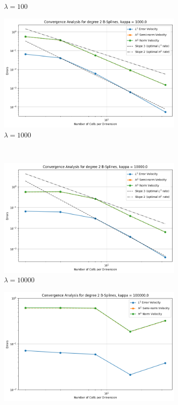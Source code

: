 \documentclass[a4paper,12pt,twoside]{report}
\begin{document}
\begin{figure}[!h]
\begin{subfigure}[b]{0.49\textwidth}
		\caption{$\lambda=100$}
	\end{subfigure}
	\begin{subfigure}[b]{0.49\textwidth}
		\centering
		\includegraphics[width=\textwidth]{convergence_degree_2_non_mixed_kappa=1000.0}
		\caption{$\lambda=1000$}
	\end{subfigure}
	\\
	\begin{subfigure}[b]{0.49\textwidth}
		\centering
		\includegraphics[width=\textwidth]{convergence_degree_2_non_mixed_kappa=10000.0}
		\caption{$\lambda=10000$}
	\end{subfigure}
	\begin{subfigure}[b]{0.49\textwidth}
		\centering
		\includegraphics[width=\textwidth]{convergence_degree_2_non_mixed_kappa=100000.0}

\end{subfigure}
\end{figure}
\end{document}
